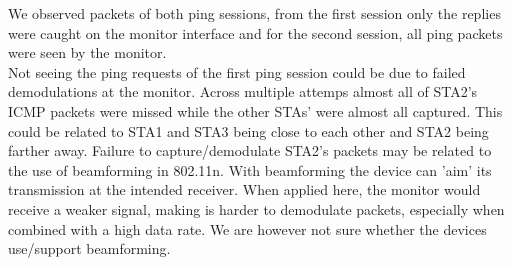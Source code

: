 We observed packets of both ping sessions, from the first session only the replies were caught on the monitor interface and for the second session, all ping packets were seen by the monitor.\\
%
Not seeing the ping requests of the first ping session could be due to failed demodulations at the monitor. Across multiple attemps almost all of STA2's ICMP packets were missed while the other STAs' were almost all captured. This could be related to STA1 and STA3 being close to each other and STA2 being farther away.
%
Failure to capture/demodulate STA2's packets may be related to the use of beamforming in 802.11n. With beamforming the device can 'aim' its transmission at the intended receiver. When applied here, the monitor would receive a weaker signal, making is harder to demodulate packets, especially when combined with a high data rate. We are however not sure whether the devices use/support beamforming.
